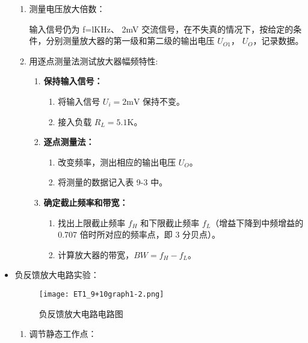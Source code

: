 \documentclass[dvipsnames, svgnames,a4paper,11pt]{article}
\begin{document}
\begin{itemize}
\begin{enumerate}
					
					\item 测量电压放大倍数：
					
						输入信号仍为 f=lKHz、 2mV 交流信号，在不失真的情况下，按给定的条件，分别测量放大器的第一级和第二级的输出电压 $U_{O1}$， $U_O$，记录数据。


					\item 用逐点测量法测试放大器幅频特性:
					
						\begin{enumerate}
							\item \textbf{保持输入信号：}
							\begin{enumerate}
								\item 将输入信号 $U_i = 2\text{mV}$ 保持不变。
								\item 接入负载 $R_L = 5.1\text{K}$。
							\end{enumerate}
						
							\item \textbf{逐点测量法：}
							\begin{enumerate}
								\item 改变频率，测出相应的输出电压 $U_O$。
								\item 将测量的数据记入表 9-3 中。
							\end{enumerate}
						
							\item \textbf{确定截止频率和带宽：}
							\begin{enumerate}
								\item 找出上限截止频率 $f_H$ 和下限截止频率 $f_L$（增益下降到中频增益的 0.707 倍时所对应的频率点，即 3 分贝点）。
								\item 计算放大器的带宽，$BW = f_H - f_L$。
							\end{enumerate}
						\end{enumerate}


				\end{enumerate}


			\item 负反馈放大电路实验：
				
				\begin{figure}[htbp]
					\centering
					\texttt{[image: ET1\_9+10graph1-2.png]}
					\caption{负反馈放大电路电路图}
					\label{fig:fig1-2t}
				\end{figure}

				\begin{enumerate}
					\item 调节静态工作点：
						

\end{enumerate}
\end{itemize}
\end{document}
